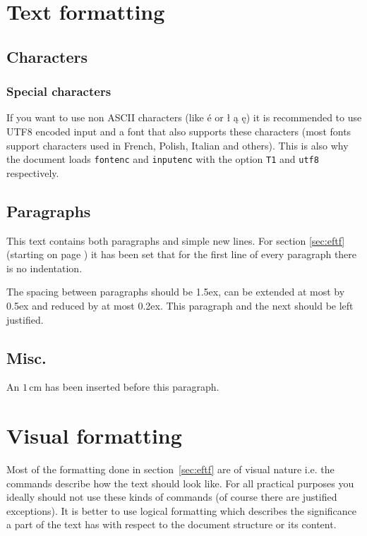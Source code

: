 \documentclass[11pt, a4paper]{article}
\begin{document}
\section{Text formatting\label{sec:eftf}}

\subsection{Characters}

\subsubsection{Special characters}
If you want to use non ASCII characters (like é or ł ą ę) it is recommended to use UTF8 encoded input and a font that also supports these characters (most fonts support characters used in French, Polish, Italian and others). This is also why the document loads \texttt{fontenc} and \texttt{inputenc} with the option \texttt{T1} and \texttt{utf8} respectively.

\subsection{Paragraphs}
This text contains both paragraphs and simple new lines. For section \ref{sec:eftf} (starting on page \pageref{sec:eftf}) it has been set that for the first line of every paragraph there is no indentation.

\begingroup
\raggedright %
The spacing between paragraphs should be 1.5ex, can be extended at most by 0.5ex and reduced by at most 0.2ex. This paragraph and the next should be left justified. 

\vspace{1cm}
\subsection{Misc.} 
An  $1$\,cm has been inserted before this paragraph.
\endgroup
\endgroup

\section{Visual formatting}
Most of the formatting done in section~\ref{sec:eftf}  are of visual nature i.e. the commands describe how the text should look like. For all practical purposes you ideally should not use these kinds of commands (of course there are justified exceptions). It is better to use logical formatting which describes the significance a part of the text has with respect to the document structure or its content.
\end{document}

